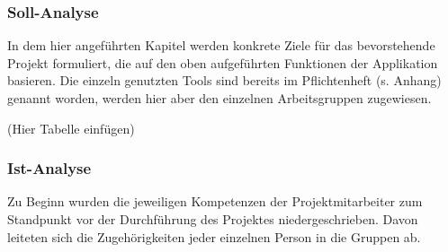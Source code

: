 \documentclass[12pt,a4paper]{article}
\begin{document}
\subsubsection{Soll-Analyse}
In dem hier angeführten Kapitel werden konkrete Ziele für das bevorstehende Projekt formuliert, die auf den oben aufgeführten Funktionen der Applikation basieren. Die einzeln genutzten Tools sind bereits im Pflichtenheft (s. Anhang) genannt worden, werden hier aber den einzelnen Arbeitsgruppen zugewiesen.

(Hier Tabelle einfügen)

\subsubsection{Ist-Analyse}
Zu Beginn wurden die jeweiligen Kompetenzen der Projektmitarbeiter zum Standpunkt vor der Durchführung des Projektes niedergeschrieben. Davon leiteten sich die Zugehörigkeiten jeder einzelnen Person in die Gruppen ab.\\
\newline
\end{document}
